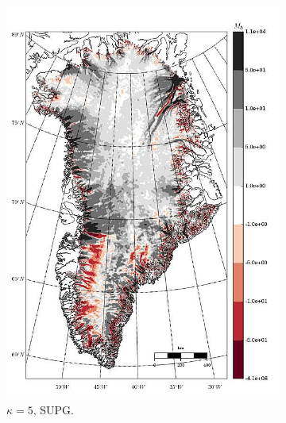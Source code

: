 \begin{figure}
\begin{subfigure}[b]{0.25\linewidth}
    \includegraphics[width=\linewidth]{images/balance_velocity/greenland/misfit_5H_kappa_5_SUPG.jpg}
  \caption{$\kappa = 5$, SUPG.}
  \label{greenland_bv_image_kappa_5_SUPG_misfit}
  \end{subfigure}
  \begin{subfigure}[b]{0.25\linewidth}

\end{subfigure}
\end{figure}
